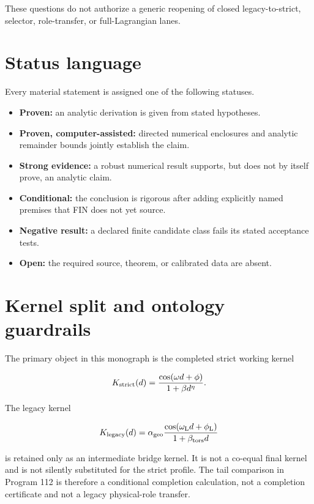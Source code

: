\documentclass[11pt,a4paper,openany]{report}
\begin{document}
These questions do not authorize a generic reopening of closed legacy-to-strict, selector, role-transfer, or full-Lagrangian lanes.

\section{Status language}

Every material statement is assigned one of the following statuses.

\begin{itemize}
\item 
\textbf{Proven:} an analytic derivation is given from stated hypotheses.

\item 
\textbf{Proven, computer-assisted:} directed numerical enclosures and analytic remainder bounds jointly establish the claim.

\item 
\textbf{Strong evidence:} a robust numerical result supports, but does not by itself prove, an analytic claim.

\item 
\textbf{Conditional:} the conclusion is rigorous after adding explicitly named premises that FIN does not yet source.

\item 
\textbf{Negative result:} a declared finite candidate class fails its stated acceptance tests.

\item 
\textbf{Open:} the required source, theorem, or calibrated data are absent.

\end{itemize}

\section{Kernel split and ontology guardrails}

The primary object in this monograph is the completed strict working kernel

\[
K_{\rm strict}(d)
=
\frac{\cos(\omega d+\phi)}{1+\beta d^\eta}.
\]

The legacy kernel

\[
K_{\rm legacy}(d)
=
\alpha_{\rm geo}
\frac{\cos(\omega_{\rm L}d+\phi_{\rm L})}
{1+\beta_{\rm tors}d}
\]

is retained only as an intermediate bridge kernel. It is not a co-equal final kernel and is not silently substituted for the strict profile. The tail comparison in Program 112 is therefore a conditional completion calculation, not a completion certificate and not a legacy physical-role transfer.
\end{document}
